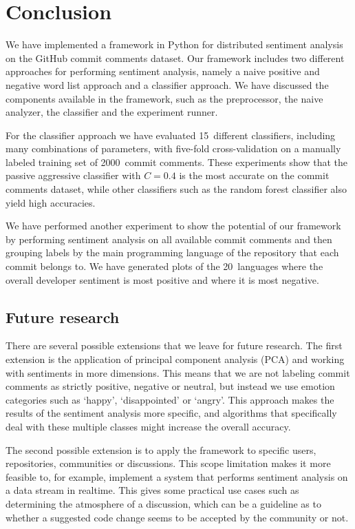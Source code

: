 \documentclass{article}
\begin{document}
\section{Conclusion}\label{sec:conclusion}
We have implemented a framework in Python for distributed sentiment analysis on
the GitHub commit comments dataset. Our framework includes two different
approaches for performing sentiment analysis, namely a naive positive and
negative word list approach and a classifier approach. We have discussed the
components available in the framework, such as the preprocessor, the naive
analyzer, the classifier and the experiment runner.

For the classifier approach we have evaluated 15~different classifiers,
including many combinations of parameters, with five-fold cross-validation on
a manually labeled training set of 2000~commit comments. These experiments show
that the passive aggressive classifier with $C = 0.4$ is the most accurate on 
the commit comments dataset, while other classifiers such as the random forest 
classifier also yield high accuracies.

We have performed another experiment to show the potential of our framework by
performing sentiment analysis on all available commit comments and then grouping
labels by the main programming language of the repository that each commit
belongs to. We have generated plots of the 20~languages where the overall
developer sentiment is most positive and where it is most negative.

\subsection{Future research}\label{sec:future-research}
There are several possible extensions that we leave for future research. The
first extension is the application of principal component analysis (PCA) and
working with sentiments in more dimensions. This means that we are not labeling
commit comments as strictly positive, negative or neutral, but instead we use
emotion categories such as `happy', `disappointed' or `angry'. This approach
makes the results of the sentiment analysis more specific, and algorithms that 
specifically deal with these multiple classes might increase the overall 
accuracy.

The second possible extension is to apply the framework to specific users,
repositories, communities or discussions. This scope limitation makes it
more feasible to, for example, implement a system that performs sentiment
analysis on a data stream in realtime. This gives some practical use cases such 
as determining the atmosphere of a discussion, which can be a guideline as to 
whether a suggested code change seems to be accepted by the community or not.
\end{document}
